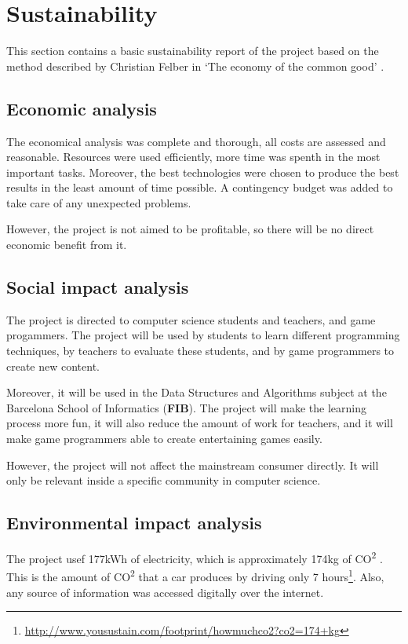 \documentclass[a4paper,11pt,titlepage,abstract,numbers=noenddot,automark,mnsy,intlimits,rgb,dvipsnames]{report}
\begin{document}
\chapter{Sustainability}
This section contains a basic sustainability report of the project based on the method described by
Christian Felber in `The economy of the common good' \cite{sustainability_report}.
\section{Economic analysis}
The economical analysis was complete and thorough, all costs are assessed and reasonable.
Resources were used efficiently, more time was spenth in the most important tasks. Moreover, the best technologies
were chosen to produce the best results in the least amount of time possible. A contingency budget was added
to take care of any unexpected problems.

However, the project is not aimed to be profitable, so there will be no direct economic benefit from it.
\section{Social impact analysis}
The project is directed to computer science students and teachers, and game progammers. The project
will be used by students to learn different programming techniques, by teachers to evaluate these students, and
by game programmers to create new content.

Moreover, it will be used in the Data Structures and Algorithms subject
at the Barcelona School of Informatics (\textbf{FIB}). The project will make the learning process more fun, it will also
reduce the amount of work for teachers, and it will make game programmers able to create entertaining games easily.

However, the project will not affect the mainstream consumer directly. It will only be relevant inside a specific
community in computer science.
\section{Environmental impact analysis}
The project usef 177kWh of electricity, which is approximately 174kg of CO\textsuperscript{2} \cite{co2}.
This is the amount of CO\textsuperscript{2} that a car produces by driving only 7
hours\footnote{\url{http://www.yousustain.com/footprint/howmuchco2?co2=174+kg}}. Also, any source of
information was accessed digitally over the internet.
\end{document}

